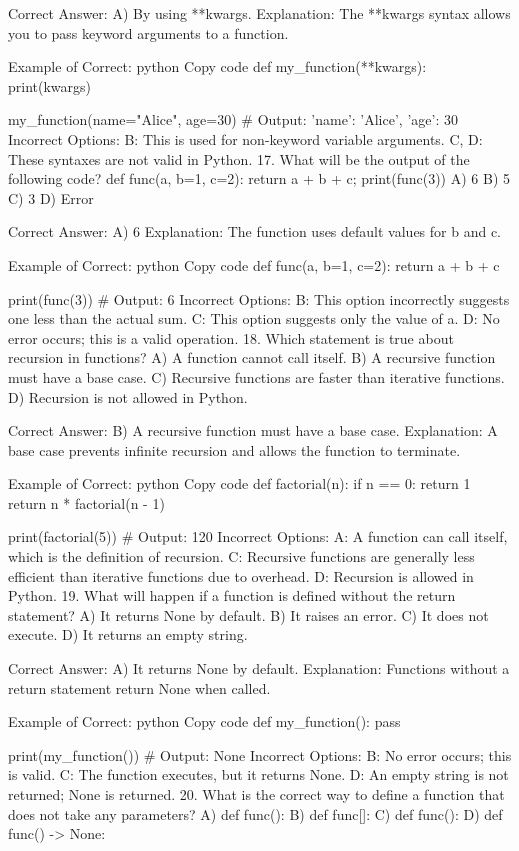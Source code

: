 Correct Answer: A) By using **kwargs.
Explanation: The **kwargs syntax allows you to pass keyword arguments to a function.

Example of Correct:
python
Copy code
def my_function(**kwargs):
    print(kwargs)

my_function(name="Alice", age=30)  # Output: {'name': 'Alice', 'age': 30}
Incorrect Options:
B: This is used for non-keyword variable arguments.
C, D: These syntaxes are not valid in Python.
17. What will be the output of the following code? def func(a, b=1, c=2): return a + b + c; print(func(3))
A) 6
B) 5
C) 3
D) Error

Correct Answer: A) 6
Explanation: The function uses default values for b and c.

Example of Correct:
python
Copy code
def func(a, b=1, c=2):
    return a + b + c

print(func(3))  # Output: 6
Incorrect Options:
B: This option incorrectly suggests one less than the actual sum.
C: This option suggests only the value of a.
D: No error occurs; this is a valid operation.
18. Which statement is true about recursion in functions?
A) A function cannot call itself.
B) A recursive function must have a base case.
C) Recursive functions are faster than iterative functions.
D) Recursion is not allowed in Python.

Correct Answer: B) A recursive function must have a base case.
Explanation: A base case prevents infinite recursion and allows the function to terminate.

Example of Correct:
python
Copy code
def factorial(n):
    if n == 0:
        return 1
    return n * factorial(n - 1)

print(factorial(5))  # Output: 120
Incorrect Options:
A: A function can call itself, which is the definition of recursion.
C: Recursive functions are generally less efficient than iterative functions due to overhead.
D: Recursion is allowed in Python.
19. What will happen if a function is defined without the return statement?
A) It returns None by default.
B) It raises an error.
C) It does not execute.
D) It returns an empty string.

Correct Answer: A) It returns None by default.
Explanation: Functions without a return statement return None when called.

Example of Correct:
python
Copy code
def my_function():
    pass

print(my_function())  # Output: None
Incorrect Options:
B: No error occurs; this is valid.
C: The function executes, but it returns None.
D: An empty string is not returned; None is returned.
20. What is the correct way to define a function that does not take any parameters?
A) def func():
B) def func[]:
C) def func(): {}
D) def func() -> None:

